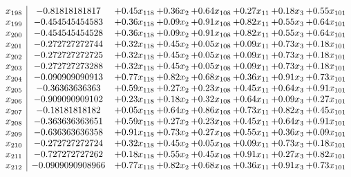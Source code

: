 \documentclass[8pt]{article}
\begin{document}
\[\begin{array}{c| c c@{\hskip 2pt} c@{\hskip 2pt} c@{\hskip 2pt} c@{\hskip 2pt} c@{\hskip 2pt} c@{\hskip 2pt} }
 x_{198}   &  -0.81818181817 & +  0.45 x_{118} & +  0.36 x_{2} & +  0.64 x_{108} & +  0.27 x_{11} & +  0.18 x_{3} & +  0.55 x_{101}\\
 x_{199}   &  -0.454545454583 & +  0.36 x_{118} & +  0.09 x_{2} & +  0.91 x_{108} & +  0.82 x_{11} & +  0.55 x_{3} & +  0.64 x_{101}\\
 x_{200}   &  -0.454545454528 & +  0.36 x_{118} & +  0.09 x_{2} & +  0.91 x_{108} & +  0.82 x_{11} & +  0.55 x_{3} & +  0.64 x_{101}\\
 x_{201}   &  -0.272727272744 & +  0.32 x_{118} & +  0.45 x_{2} & +  0.05 x_{108} & +  0.09 x_{11} & +  0.73 x_{3} & +  0.18 x_{101}\\
 x_{202}   &  -0.272727272725 & +  0.32 x_{118} & +  0.45 x_{2} & +  0.05 x_{108} & +  0.09 x_{11} & +  0.73 x_{3} & +  0.18 x_{101}\\
 x_{203}   &  -0.272727273288 & +  0.32 x_{118} & +  0.45 x_{2} & +  0.05 x_{108} & +  0.09 x_{11} & +  0.73 x_{3} & +  0.18 x_{101}\\
 x_{204}   &  -0.090909090913 & +  0.77 x_{118} & +  0.82 x_{2} & +  0.68 x_{108} & +  0.36 x_{11} & +  0.91 x_{3} & +  0.73 x_{101}\\
 x_{205}   &  -0.36363636363 & +  0.59 x_{118} & +  0.27 x_{2} & +  0.23 x_{108} & +  0.45 x_{11} & +  0.64 x_{3} & +  0.91 x_{101}\\
 x_{206}   &  -0.909090909102 & +  0.23 x_{118} & +  0.18 x_{2} & +  0.32 x_{108} & +  0.64 x_{11} & +  0.09 x_{3} & +  0.27 x_{101}\\
 x_{207}   &  -0.18181818182 & +  0.05 x_{118} & +  0.64 x_{2} & +  0.86 x_{108} & +  0.73 x_{11} & +  0.82 x_{3} & +  0.45 x_{101}\\
 x_{208}   &  -0.363636363651 & +  0.59 x_{118} & +  0.27 x_{2} & +  0.23 x_{108} & +  0.45 x_{11} & +  0.64 x_{3} & +  0.91 x_{101}\\
 x_{209}   &  -0.636363636358 & +  0.91 x_{118} & +  0.73 x_{2} & +  0.27 x_{108} & +  0.55 x_{11} & +  0.36 x_{3} & +  0.09 x_{101}\\
 x_{210}   &  -0.272727272724 & +  0.32 x_{118} & +  0.45 x_{2} & +  0.05 x_{108} & +  0.09 x_{11} & +  0.73 x_{3} & +  0.18 x_{101}\\
 x_{211}   &  -0.727272727262 & +  0.18 x_{118} & +  0.55 x_{2} & +  0.45 x_{108} & +  0.91 x_{11} & +  0.27 x_{3} & +  0.82 x_{101}\\
 x_{212}   &  -0.0909090908966 & +  0.77 x_{118} & +  0.82 x_{2} & +  0.68 x_{108} & +  0.36 x_{11} & +  0.91 x_{3} & +  0.73 x_{101}\\

\end{array}\]
\end{document}
